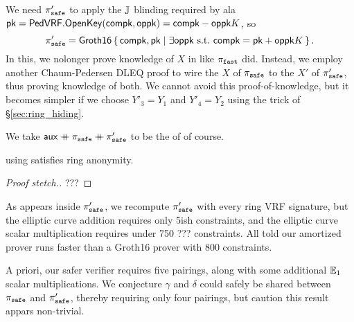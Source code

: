 We need $\pi_{\mathtt{safe}}'$ to apply the ${\mathbb{J}}$ blinding required by \PedVRF
ala $\mathsf{pk} = {\mathsf{PedVRF}}.{\mathsf{OpenKey}}(\mathsf{compk},\mathsf{oppk}) = \mathsf{compk} - \mathsf{oppk} K$, so
$$ \pisafe' = \rrSNARK \Setst{ \compk, \pk }{
 \exists \openpk \textrm{\ s.t.\ } \compk = \pk + \openpk \genB
} \mathperiod $$
In this, we nolonger prove knowledge of $X$ in \PedVRF like $\pi_{\mathtt{fast}}$ did.
Instead, we employ another Chaum-Pedersen DLEQ proof to wire
 the $X$ of $\pi_{\mathtt{safe}}$ to the $X'$ of $\pi_{\mathtt{safe}}'$,
 thus proving knowledge of both.
We cannot avoid this proof-of-knowledge, but it becomes simpler if
we choose $Y'_3 = Y_1$ and $Y'_4 = Y_2$ using the trick of \S\ref{sec:ring_hiding}.

We take $\mathsf{aux} \mathbin{+\mkern-10mu+} \pi_{\mathtt{safe}} \mathbin{+\mkern-10mu+} \pi_{\mathtt{safe}}'$
 to be the \aux of \PedVRF of course.

\begin{proposition}\label{prop:pisafe_anonymity}
\rVRF using \pisafe satisfies ring anonymity.
\end{proposition}

\begin{proof}[Proof stetch.]
???
\end{proof}


As \openpk appears inside $\pi_{\mathtt{safe}}'$, we recompute $\pi_{\mathtt{safe}}'$ with
every ring VRF signature, but the elliptic curve addition requires
only 5ish constraints, and the elliptic curve scalar multiplication
requires under 750 ??? constraints. 
All told our amortized prover runs faster than a Groth16 prover
with 800 constraints.

A priori, our safer verifier requires five pairings, along with
some additional ${\mathbb{E}}_1$ scalar multiplications.
We conjecture $\gamma$ and $\delta$ could safely be shared between
$\pi_{\mathtt{safe}}$ and $\pi_{\mathtt{safe}}'$, thereby requiring only four pairings,
but caution this result appars non-trivial.


